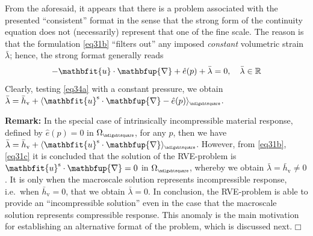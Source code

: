 \documentclass[12pt,a4paper]{article}
\renewcommand{\ta}[1]{\mathbfit{#1}}
\renewcommand{\diff}{\mathbfup{\nabla}}
\renewcommand{\Box}{\mdlgwhtsquare}
\DeclarePairedDelimiter{\homgen}{\langle}{\rangle_\rve}
\renewcommand{\vol}{\mathrm{v}}
\newcommand{\rve}{
  {\mathchoice
   {\mbox{\scalebox{0.67}{$\Box$}}}
   {\mbox{\scalebox{0.67}{$\Box$}}}
   {\mbox{\scalebox{0.5}{$\Box$}}}
   {\mbox{\scalebox{0.375}{$\Box$}}}
  }
}
\begin{document}
From the aforesaid, it appears that there is a problem associated with the presented ``consistent'' format in the sense that the strong form of the continuity equation does not (necessarily) represent that one of the fine scale.
The reason is that the formulation \cref{eq31b} ``filters out'' any imposed \emph{constant} volumetric strain $\bar{\lambda}$; hence, the strong format generally reads
\begin{equation}
    - \ta{u}\cdot\diff + \hat{e}(p) + \bar{\lambda} = 0, \quad \bar{\lambda}\in\set{R}
\label{eq34a}
\end{equation}
Clearly, testing \cref{eq34a} with a constant pressure, we obtain $\bar{\lambda}=\bar{h}_\vol+\homgen{\ta{u}^\fluct\cdot\diff-\hat{e}(p)}$.

\textbf{Remark:} In the special case of intrinsically incompressible material response, defined by $\hat{e}(p)=0$ in $\Omega_\rve$, for any $p$, then we have  $\bar{\lambda}=\bar{h}_\vol+\homgen{\ta{u}^\fluct\cdot\diff}$.
However, from \cref{eq31b}, \cref{eq31c} it is concluded that the solution of the RVE-problem is $\ta{u}^\fluct\cdot\diff=0$ in $\Omega_\rve$, whereby we obtain $\bar{\lambda}=\bar{h}_\vol \neq 0$.
It is only when the macroscale solution represents incompressible response, i.e.\ when $\bar{h}_\vol = 0$, that we obtain $\bar{\lambda} = 0$.
In conclusion, the RVE-problem is able to provide an ``incompressible solution'' even in the case that the macroscale solution represents compressible response.
This anomaly is the main motivation for establishing an alternative format of the problem, which is discussed next. $\Box$
\end{document}
